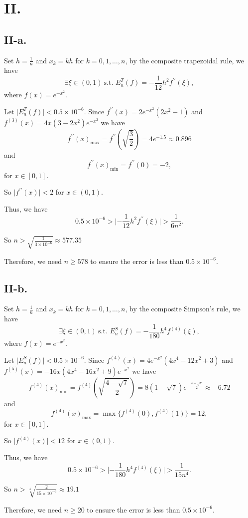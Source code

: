 \documentclass[a4paper]{article}
\begin{document}
\section*{II.}
\subsection*{II-a.}
Set $h=\frac{1}{n}$ and $x_k=kh$ for $k=0,1,\ldots,n$, by the composite trapezoidal rule, we have 
$$
\exists \xi\in(0,1)\ \text{s.t. } E_n^T(f)=-\frac{1}{12}h^2f^{\prime\prime}(\xi),
$$
where $f(x)=e^{-x^2}.$

Let $\lvert E_n^T(f) \rvert<0.5\times10^{-6}$. Since $f^{\prime\prime}(x)=2e^{-x^2}(2x^2-1)$ and $f^{(3)}(x)=4x(3-2x^2)e^{-x^2}$ we have
$$
f^{\prime\prime}(x)_{\max}=f^{\prime\prime}(\sqrt{\frac{3}{2}})=4e^{-1.5}\approx 0.896
$$
and 
$$
f^{\prime\prime}(x)_{\min}=f^{\prime\prime}(0)=-2,
$$
for $x\in[0,1]$.

So $\lvert f^{\prime\prime}(x)\rvert < 2$ for $x\in(0,1).$

Thus, we have
$$
0.5\times10^{-6}>\lvert-\frac{1}{12}h^2f^{\prime\prime}(\xi)\rvert> \frac{1}{6n^2}.
$$

So $n>\sqrt{\frac{1}{3\times10^{-6}}}\approx 577.35$

Therefore, we need $n\geq 578$ to ensure the error is less than $0.5\times10^{-6}$.

\subsection*{II-b.}
Set $h=\frac{1}{n}$ and $x_k=kh$ for $k=0,1,\ldots,n$, by the composite Simpson's rule, we have 
$$
\exists \xi\in(0,1)\ \text{s.t. } E_n^S(f)=-\frac{1}{180}h^4f^{(4)}(\xi),
$$
where $f(x)=e^{-x^2}.$

Let $\lvert E_n^S(f) \rvert<0.5\times10^{-6}$. Since $f^{(4)}(x)=4e^{-x^2}(4x^4-12x^2+3)$ and $f^{(5)}(x)=-16x(4x^4-16x^2+9)e^{-x^2}$ we have
$$
f^{(4)}(x)_{\min}=f^{(4)}(\sqrt{\frac{4-\sqrt{7}}{2}})=8(1-\sqrt{7})e^{-\frac{4-\sqrt{7}}{2}}\approx -6.72
$$
and 
$$
f^{(4)}(x)_{\max}=\max\{f^{(4)}(0),f^{(4)}(1)\}=12,
$$
for $x\in[0,1]$.

So $\lvert f^{(4)}(x)\rvert < 12$ for $x\in(0,1).$

Thus, we have
$$
0.5\times10^{-6}>\lvert-\frac{1}{180}h^4f^{(4)}(\xi)\rvert> \frac{1}{15n^4}.
$$

So $n>\sqrt[4]{\frac{2}{15\times10^{-6}}}\approx 19.1$

Therefore, we need $n\geq 20$ to ensure the error is less than $0.5\times10^{-6}$.
\end{document}
